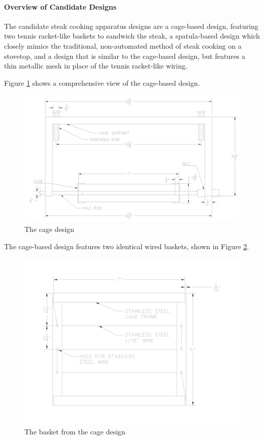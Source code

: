 \documentclass[11pt]{article}
\newcommand{\subsubsubsection}[1]{\paragraph{#1}\mbox{}}
\begin{document}
\subsubsubsection{Overview of Candidate Designs}

\noindent
The candidate steak cooking apparatus designs are a cage-based design, featuring two tennis racket-like baskets to sandwich the steak, a spatula-based design which closely mimics the traditional, non-automated method of steak cooking on a stovetop, and a design that is similar to the cage-based design, but features a thin metallic mesh in place of the tennis racket-like wiring.

Figure \ref{fig:cage} shows a comprehensive view of the cage-based design.

\begin{figure}[H]
  \centering
  \includegraphics[width=0.6\linewidth]{res/cage.png}
  \caption{The cage design}
  \label{fig:cage}
\end{figure}

The cage-based design features two identical wired baskets, shown in Figure \ref{fig:cage basket}.

\begin{figure}[H]
  \centering
  \includegraphics[width=0.6\linewidth]{res/cage_basket.png}
  \caption{The basket from the cage design}
  \label{fig:cage basket}
\end{figure}
\end{document}

